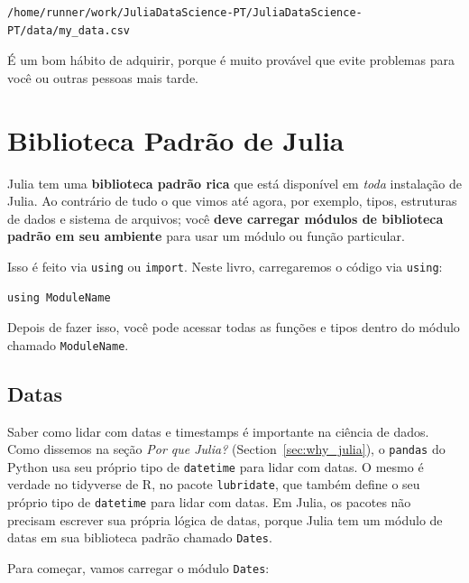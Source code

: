 \documentclass[
  notoc %
]{tufte-book}
\newcommand{\passthrough}[1]{#1}
\begin{document}
\begin{lstlisting}[language=Output]
/home/runner/work/JuliaDataScience-PT/JuliaDataScience-PT/data/my_data.csv
\end{lstlisting}

É um bom hábito de adquirir, porque é muito provável que evite problemas
para você ou outras pessoas mais tarde.

\hypertarget{sec:standardlibrary}{%
\section{Biblioteca Padrão de Julia}\label{sec:standardlibrary}}

Julia tem uma \textbf{biblioteca padrão rica} que está disponível em
\emph{toda} instalação de Julia. Ao contrário de tudo o que vimos até
agora, por exemplo, tipos, estruturas de dados e sistema de arquivos;
você \textbf{deve carregar módulos de biblioteca padrão em seu ambiente}
para usar um módulo ou função particular.

Isso é feito via \passthrough{\lstinline!using!} ou
\passthrough{\lstinline!import!}. Neste livro, carregaremos o código via
\passthrough{\lstinline!using!}:

\begin{lstlisting}
using ModuleName
\end{lstlisting}

Depois de fazer isso, você pode acessar todas as funções e tipos dentro
do módulo chamado \passthrough{\lstinline!ModuleName!}.

\hypertarget{sec:dates}{%
\subsection{Datas}\label{sec:dates}}

Saber como lidar com datas e timestamps é importante na ciência de
dados. Como dissemos na seção \emph{Por que Julia?}
(Section~\ref{sec:why_julia}), o \passthrough{\lstinline!pandas!} do
Python usa seu próprio tipo de \passthrough{\lstinline!datetime!} para
lidar com datas. O mesmo é verdade no tidyverse de R, no pacote
\passthrough{\lstinline!lubridate!}, que também define o seu próprio
tipo de \passthrough{\lstinline!datetime!} para lidar com datas. Em
Julia, os pacotes não precisam escrever sua própria lógica de datas,
porque Julia tem um módulo de datas em sua biblioteca padrão chamado
\passthrough{\lstinline!Dates!}.

Para começar, vamos carregar o módulo \passthrough{\lstinline!Dates!}:
\end{document}
